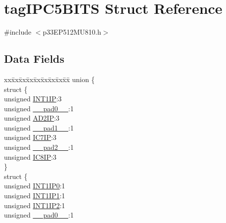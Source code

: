 \hypertarget{structtag_i_p_c5_b_i_t_s}{}\section{tag\+I\+P\+C5\+B\+I\+TS Struct Reference}
\label{structtag_i_p_c5_b_i_t_s}


{\ttfamily \#include $<$p33\+E\+P512\+M\+U810.\+h$>$}

\subsection*{Data Fields}
\begin{DoxyCompactItemize}
\item 
\begin{tabbing}
xx\=xx\=xx\=xx\=xx\=xx\=xx\=xx\=xx\=\kill
union \{\\
\>struct \{\\
\>\>unsigned \hyperlink{structtag_i_p_c5_b_i_t_s_a43d4d7c5ac69be80cedb0b6973d8c4e9}{INT1IP}:3\\
\>\>unsigned \hyperlink{structtag_i_p_c5_b_i_t_s_adf71f3d8410c1f1dbbc96680a92c49af}{\_\_pad0\_\_}:1\\
\>\>unsigned \hyperlink{structtag_i_p_c5_b_i_t_s_af59664fd09f0bc21a93e7f856ae18b15}{AD2IP}:3\\
\>\>unsigned \hyperlink{structtag_i_p_c5_b_i_t_s_acaf2d0924a107ec6e8d2e31febaf66f9}{\_\_pad1\_\_}:1\\
\>\>unsigned \hyperlink{structtag_i_p_c5_b_i_t_s_a12c7fac21cdc1dd1b7c400e484dc7344}{IC7IP}:3\\
\>\>unsigned \hyperlink{structtag_i_p_c5_b_i_t_s_a4d97cc5f7d51d22fc2bf3eab35c9cb7f}{\_\_pad2\_\_}:1\\
\>\>unsigned \hyperlink{structtag_i_p_c5_b_i_t_s_a3b334f54be3c0c31c15604c8736bf41b}{IC8IP}:3\\
\>\} \\
\>struct \{\\
\>\>unsigned \hyperlink{structtag_i_p_c5_b_i_t_s_aa8fab59ee5550b9e58569232d2922219}{INT1IP0}:1\\
\>\>unsigned \hyperlink{structtag_i_p_c5_b_i_t_s_a8820c0a2c1a485d0faf36c34c7afb7a4}{INT1IP1}:1\\
\>\>unsigned \hyperlink{structtag_i_p_c5_b_i_t_s_ad96bd04af07069a1527ed6a08b2150b8}{INT1IP2}:1\\
\>\>unsigned \hyperlink{structtag_i_p_c5_b_i_t_s_adf71f3d8410c1f1dbbc96680a92c49af}{\_\_pad0\_\_}:1\\

\end{tabbing}
\end{DoxyCompactItemize}
